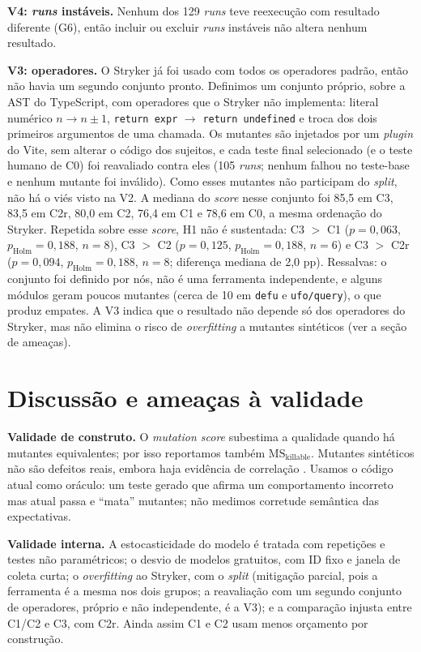 \documentclass[12pt]{article}
\begin{document}
\textbf{V4: \textit{runs} instáveis.} Nenhum dos 129 \textit{runs} teve reexecução com resultado diferente (G6), então incluir ou excluir
\textit{runs} instáveis não altera nenhum resultado.

\textbf{V3: operadores.} O Stryker já foi usado com todos os operadores padrão, então não havia um segundo conjunto pronto. Definimos
um conjunto próprio, sobre a AST do TypeScript, com operadores que o Stryker não implementa: literal numérico $n\to n\pm1$, \texttt{return
expr} $\to$ \texttt{return undefined} e troca dos dois primeiros argumentos de uma chamada. Os mutantes são injetados por um
\textit{plugin} do Vite, sem alterar o código dos sujeitos, e cada teste final selecionado (e o teste humano de C0) foi reavaliado contra
eles (105 \textit{runs}; nenhum falhou no teste-base e nenhum mutante foi inválido). Como esses mutantes não participam do \textit{split}, não
há o viés visto na V2. A mediana do \textit{score} nesse conjunto foi 85,5 em C3, 83,5 em C2r, 80,0 em C2, 76,4 em C1 e 78,6 em C0, a mesma
ordenação do Stryker. Repetida sobre esse \textit{score}, H1 não é sustentada: C3 $>$ C1 ($p=0{,}063$, $p_{\text{Holm}}=0{,}188$, $n=8$),
C3 $>$ C2 ($p=0{,}125$, $p_{\text{Holm}}=0{,}188$, $n=6$) e C3 $>$ C2r ($p=0{,}094$, $p_{\text{Holm}}=0{,}188$, $n=8$; diferença mediana de 2,0 pp).
Ressalvas: o conjunto foi definido por nós, não é uma ferramenta independente, e alguns módulos geram poucos mutantes (cerca de 10 em
\texttt{defu} e \texttt{ufo/query}), o que produz empates. A V3 indica que o resultado não depende só dos operadores do Stryker, mas não
elimina o risco de \textit{overfitting} a mutantes sintéticos (ver a seção de ameaças).

\section{Discussão e ameaças à validade}
\label{sec:ameacas}

\textbf{Validade de construto.} O \textit{mutation score} subestima a qualidade quando há mutantes equivalentes; por isso
reportamos também $\text{MS}_{\text{killable}}$. Mutantes sintéticos não são defeitos reais, embora haja evidência de
correlação \cite{just2014}. Usamos o código atual como oráculo: um teste gerado que afirma um comportamento incorreto
mas atual passa e ``mata'' mutantes; não medimos corretude semântica das expectativas.

\textbf{Validade interna.} A estocasticidade do modelo é tratada com repetições e testes não paramétricos; o desvio de
modelos gratuitos, com ID fixo e janela de coleta curta; o \textit{overfitting} ao Stryker, com o \textit{split} (mitigação
parcial, pois a ferramenta é a mesma nos dois grupos; a reavaliação com um segundo conjunto de operadores, próprio e não independente, é a V3); e a comparação
injusta entre C1/C2 e C3, com C2r. Ainda assim C1 e C2 usam menos orçamento por construção.
\end{document}
